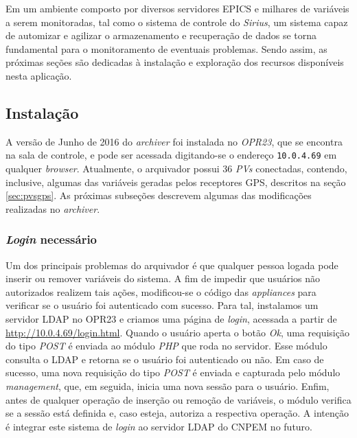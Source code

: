 \vspace{12pt}


Em um ambiente composto por diversos servidores EPICS e milhares de variáveis a
serem monitoradas, tal como o sistema de controle do \textit{Sirius}, um sistema
capaz de automizar e agilizar o armazenamento e recuperação de dados se torna fundamental para o
monitoramento de eventuais problemas. Sendo assim, as próximas seções são
dedicadas à instalação e exploração dos recursos disponíveis nesta aplicação.

\subsection {Instalação}

A versão de Junho de 2016 do \textit{archiver} foi instalada no \textit{OPR23},
que se encontra na sala de controle, e pode ser acessada digitando-se o endereço
\texttt{10.0.4.69} em qualquer \textit{browser}. Atualmente, o arquivador possui
36 \textit{PVs} conectadas, contendo, inclusive, algumas das variáveis geradas
pelos receptores GPS, descritos na seção \ref{sec:pvsgps}. As próximas
subseções descrevem algumas das modificações realizadas no \textit{archiver}.

\subsubsection{\textit{Login} necessário}

Um dos principais problemas do arquivador é que qualquer pessoa logada
pode inserir ou remover variáveis do sistema. A fim de impedir que usuários não
autorizados realizem tais ações, modificou-se o código das
\textit{appliances} para verificar se o usuário foi autenticado com sucesso.
Para tal, instalamos um servidor LDAP no OPR23 e criamos uma página
de \textit{login}, acessada a partir de \url{http://10.0.4.69/login.html}. Quando o
usuário aperta o botão \textit{Ok}, uma requisição do tipo \textit{POST} é
enviada ao módulo \textit{PHP} que roda no servidor. Esse módulo consulta o LDAP
e retorna se o usuário foi autenticado ou não. Em caso de sucesso, uma nova
requisição do tipo \textit{POST} é enviada e capturada pelo módulo
\textit{management}, que, em seguida, inicia uma nova sessão para o usuário.
Enfim, antes de qualquer operação de inserção ou remoção de variáveis, o
módulo verifica se a sessão está definida e, caso esteja, autoriza a respectiva
operação. A intenção é integrar este sistema de \textit{login} ao servidor
LDAP do CNPEM no futuro.

